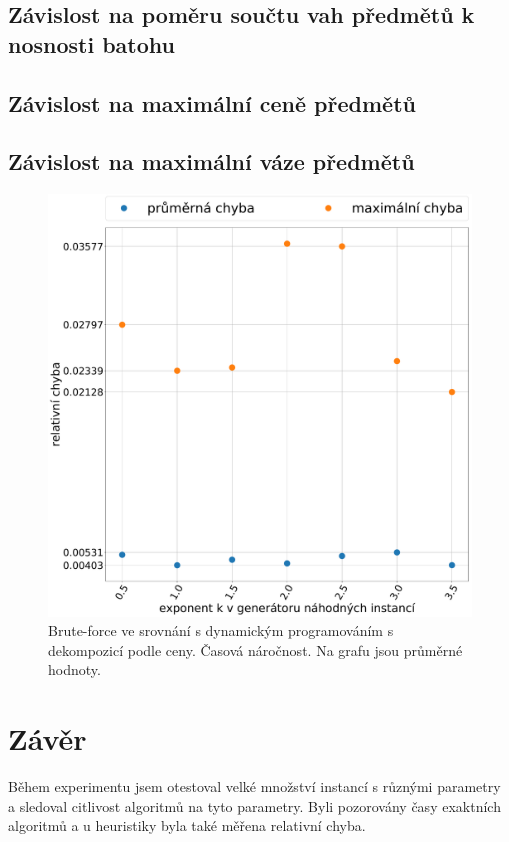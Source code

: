 \documentclass[11pt]{article}
\begin{document}
\subsection{Závislost na poměru součtu vah předmětů k nosnosti batohu}
\subsection{Závislost na maximální ceně předmětů}
\subsection{Závislost na maximální váze předmětů}




\begin{figure}[h]\centering
	\includegraphics[scale=0.2]{img/GMHE}
 	\caption[1]{Brute-force ve srovnání s dynamickým programováním s dekompozicí podle ceny. Časová náročnost. Na grafu jsou průměrné hodnoty.}\label{fig:1}
 \end{figure} 	


\section{Závěr}
Během experimentu jsem otestoval velké množství instancí s různými parametry a sledoval citlivost algoritmů na tyto parametry. Byli pozorovány časy exaktních algoritmů a u heuristiky byla také měřena relativní chyba. 
\end{document}
